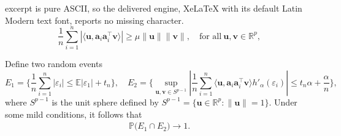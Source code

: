 \documentclass[10pt,a4paper]{amsart}
\begin{document}
excerpt is pure ASCII, so the delivered engine, XeLaTeX with its default Latin Modern text font, reports no missing character.
		\begin{equation}\label{cond-ai-c1c2}
		\frac{1}{n}\sum_{i=1}^n|\langle \mathbf{u},\mathbf{a}_i\mathbf{a}_i^\top \mathbf{v}\rangle |\geq \mu\|\mathbf{u}\|\|\mathbf{v}\|, \quad \text{for all} ~\mathbf{u}, \mathbf{v}\in\mathbb{R}^p,
	\end{equation}

\begin{lemma}\label{prob-E} Define two random events $$E_1=\big\{\frac{1}{n}\sum_{i=1}^n|\varepsilon_i|\leq\mathbb{E}|\varepsilon_1|+t_n\big\},\quad E_2=\{\sup_{\mathbf{u},\mathbf{v}\in S^{p-1}}|\frac{1}{n}\sum_{i=1}^n\langle \mathbf{u}, \mathbf{a}_i\mathbf{a}_i^\top\mathbf{v}\rangle h'_{\alpha}(\varepsilon_i)|\leq t_n\alpha+\frac{\alpha}{n}\},$$
	where $S^{p-1}$ is the unit sphere defined by $S^{p-1}=\{\mathbf{u}\in\mathbb{R}^p: \|\mathbf{u}\|=1\}$. Under some mild conditions, it follows that
	\begin{equation}\label{prob-E1E2}
		\begin{aligned}\mathbb{P}\big( E_1\cap E_2\big)\to 1.\nonumber	\end{aligned}
	\end{equation}		
\end{lemma}
\end{document}
